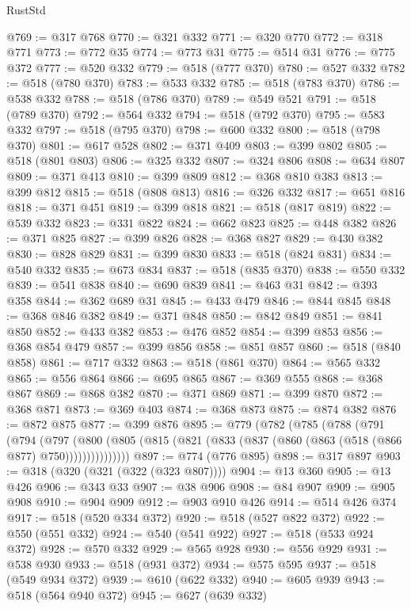 \begin{lexlean}{RustStd}
\begin{coremodule}
{\begin{coremodule}
{{{{{{{{{{{{{{{{{{{{{{{{{{{{{{{{{{{{{{{{{{{{{{{{{{@769 := @317 @768
@770 := @321 @332
@771 := @320 @770
@772 := @318 @771
@773 := @772 @35
@774 := @773 @31
@775 := @514 @31
@776 := @775 @372
@777 := @520 @332
@779 := @518 (@777 @370)
@780 := @527 @332
@782 := @518 (@780 @370)
@783 := @533 @332
@785 := @518 (@783 @370)
@786 := @538 @332
@788 := @518 (@786 @370)
@789 := @549 @521
@791 := @518 (@789 @370)
@792 := @564 @332
@794 := @518 (@792 @370)
@795 := @583 @332
@797 := @518 (@795 @370)
@798 := @600 @332
@800 := @518 (@798 @370)
@801 := @617 @528
@802 := @371 @409
@803 := @399 @802
@805 := @518 (@801 @803)
@806 := @325 @332
@807 := @324 @806
@808 := @634 @807
@809 := @371 @413
@810 := @399 @809
@812 := @368 @810 @383
@813 := @399 @812
@815 := @518 (@808 @813)
@816 := @326 @332
@817 := @651 @816
@818 := @371 @451
@819 := @399 @818
@821 := @518 (@817 @819)
@822 := @539 @332
@823 := @331 @822
@824 := @662 @823
@825 := @448 @382
@826 := @371 @825
@827 := @399 @826
@828 := @368 @827
@829 := @430 @382
@830 := @828 @829
@831 := @399 @830
@833 := @518 (@824 @831)
@834 := @540 @332
@835 := @673 @834
@837 := @518 (@835 @370)
@838 := @550 @332
@839 := @541 @838
@840 := @690 @839
@841 := @463 @31
@842 := @393 @358
@844 := @362 @689 @31
@845 := @433 @479
@846 := @844 @845
@848 := @368 @846 @382
@849 := @371 @848
@850 := @842 @849
@851 := @841 @850
@852 := @433 @382
@853 := @476 @852
@854 := @399 @853
@856 := @368 @854 @479
@857 := @399 @856
@858 := @851 @857
@860 := @518 (@840 @858)
@861 := @717 @332
@863 := @518 (@861 @370)
@864 := @565 @332
@865 := @556 @864
@866 := @695 @865
@867 := @369 @555
@868 := @368 @867
@869 := @868 @382
@870 := @371 @869
@871 := @399 @870
@872 := @368 @871
@873 := @369 @403
@874 := @368 @873
@875 := @874 @382
@876 := @872 @875
@877 := @399 @876
@895 := @779
    (@782
      (@785
        (@788
          (@791
            (@794
              (@797
                (@800
                  (@805 (@815 (@821 (@833 (@837 (@860 (@863 (@518 (@866 @877) @750)))))))))))))))
@897 := @774 (@776 @895)
@898 := @317 @897
@903 := @318 (@320 (@321 (@322 (@323 @807))))
@904 := @13 @360
@905 := @13 @426
@906 := @343 @33
@907 := @38 @906
@908 := @84 @907
@909 := @905 @908
@910 := @904 @909
@912 := @903 @910 @426
@914 := @514 @426 @374
@917 := @518 (@520 @334 @372)
@920 := @518 (@527 @822 @372)
@922 := @550 (@551 @332)
@924 := @540 (@541 @922)
@927 := @518 (@533 @924 @372)
@928 := @570 @332
@929 := @565 @928
@930 := @556 @929
@931 := @538 @930
@933 := @518 (@931 @372)
@934 := @575 @595
@937 := @518 (@549 @934 @372)
@939 := @610 (@622 @332)
@940 := @605 @939
@943 := @518 (@564 @940 @372)
@945 := @627 (@639 @332)
}}}}}}}}}}}}}}}}}}}}}}}}}}}}}}}}}}}}}}}}}}}}}}}}}}
\end{coremodule}}
\end{coremodule}
\end{lexlean}
